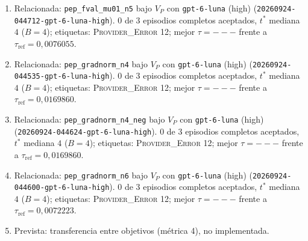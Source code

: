 \documentclass[11pt,a4paper]{article}
\begin{document}
\begin{enumerate}
  \item Relacionada: \texttt{pep\_\allowbreak{}fval\_\allowbreak{}mu01\_\allowbreak{}n5} bajo $V_P$ con \texttt{gpt-\allowbreak{}6-\allowbreak{}luna} (high) (\texttt{20260924-\allowbreak{}044712-\allowbreak{}gpt-\allowbreak{}6-\allowbreak{}luna-\allowbreak{}high}). 0 de 3 episodios completos aceptados, $t^*$ mediana $4$ ($B = 4$); etiquetas: \textsc{Provider\_Error} 12; mejor $\tau = ---$ frente a $\tau_{\mathrm{ref}} = 0{,}0076055$.
  \item Relacionada: \texttt{pep\_\allowbreak{}gradnorm\_\allowbreak{}n4} bajo $V_P$ con \texttt{gpt-\allowbreak{}6-\allowbreak{}luna} (high) (\texttt{20260924-\allowbreak{}044535-\allowbreak{}gpt-\allowbreak{}6-\allowbreak{}luna-\allowbreak{}high}). 0 de 3 episodios completos aceptados, $t^*$ mediana $4$ ($B = 4$); etiquetas: \textsc{Provider\_Error} 12; mejor $\tau = ---$ frente a $\tau_{\mathrm{ref}} = 0{,}0169860$.
  \item Relacionada: \texttt{pep\_\allowbreak{}gradnorm\_\allowbreak{}n4\_\allowbreak{}neg} bajo $V_P$ con \texttt{gpt-\allowbreak{}6-\allowbreak{}luna} (high) (\texttt{20260924-\allowbreak{}044624-\allowbreak{}gpt-\allowbreak{}6-\allowbreak{}luna-\allowbreak{}high}). 0 de 3 episodios completos aceptados, $t^*$ mediana $4$ ($B = 4$); etiquetas: \textsc{Provider\_Error} 12; mejor $\tau = ---$ frente a $\tau_{\mathrm{ref}} = 0{,}0169860$.
  \item Relacionada: \texttt{pep\_\allowbreak{}gradnorm\_\allowbreak{}n6} bajo $V_P$ con \texttt{gpt-\allowbreak{}6-\allowbreak{}luna} (high) (\texttt{20260924-\allowbreak{}044600-\allowbreak{}gpt-\allowbreak{}6-\allowbreak{}luna-\allowbreak{}high}). 0 de 3 episodios completos aceptados, $t^*$ mediana $4$ ($B = 4$); etiquetas: \textsc{Provider\_Error} 12; mejor $\tau = ---$ frente a $\tau_{\mathrm{ref}} = 0{,}0072223$.
  \item Prevista: transferencia entre objetivos (métrica 4), no implementada.
\end{enumerate}


\end{document}
